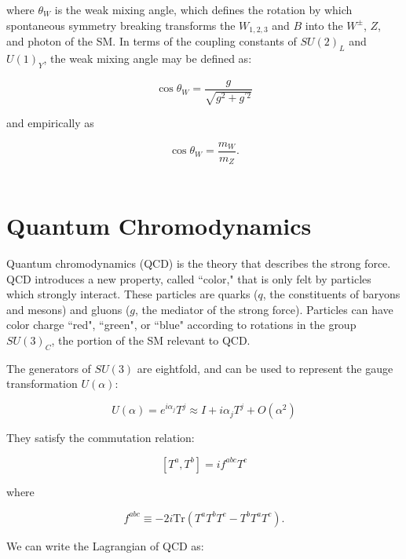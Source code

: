 \noindent where $\theta_{W}$ is the weak mixing angle, which defines the rotation by which spontaneous symmetry breaking transforms the $W_{1,2,3}$ and $B$ into the $W^{\pm}$, $Z$, and photon of the SM. In terms of the coupling constants of $SU(2)_{L}$ and $U(1)_{Y}$, the weak mixing angle may be defined as\cite{srednicki}:

\begin{equation}
\cos \theta_{W} = \frac{g}{\sqrt{g^{2} + g^{\prime2}}}
\end{equation}

\noindent and empirically as 

\begin{equation}
\cos \theta_{W} = \frac{m_{W}}{m_{Z}}.
\end{equation}~\cite{halzen}

\section{Quantum Chromodynamics}

Quantum chromodynamics (QCD) is the theory that describes the strong force. QCD introduces a new property, called ``color," that is only felt by particles which strongly interact. These particles are quarks ($q$, the constituents of baryons and mesons) and gluons ($g$, the mediator of the strong force). Particles can have color charge ``red", ``green", or ``blue" according to rotations in the group $SU(3)_{C}$, the portion of the SM relevant to QCD.

The generators of $SU(3)$ are eightfold, and can be used to represent the gauge transformation $U(\alpha)$:

\begin{equation}
U(\alpha) = e^{i\alpha_{j}}T^{j} \approx I + i\alpha_{j}T^{j} + O(\alpha^{2})
\end{equation}

\noindent They satisfy the commutation relation:

\begin{equation}
\left[T^{a}, T^{b}\right] = if^{abc}T^{c}
\end{equation}

\noindent where 

\begin{equation}
f^{abc} \equiv -2i\text{Tr}\left(T^{a}T^{b}T^{c} - T^{b}T^{a}T^{c}\right).
\end{equation}

\noindent We can write the Lagrangian of QCD as:

